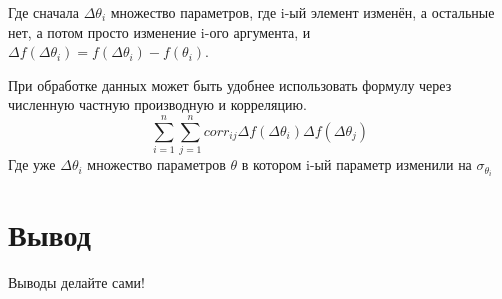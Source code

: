 \documentclass[a4paper,12pt]{article}
\begin{document}
 Где  сначала $\Delta \theta_i$ множество параметров, где i-ый элемент изменён, а остальные нет, а потом просто изменение i-ого аргумента,
  и $\Delta f(\Delta \theta_i) = f(\Delta \theta_i) - f(\theta_i)$.

При обработке данных может быть удобнее использовать формулу через численную частную производную и корреляцию.
\[  \sum_{i=1}^{n}\sum_{j=1}^{n} corr_{ij}\Delta f(\Delta \theta_i)\Delta f(\Delta \theta_j) \]
Где уже $\Delta \theta_i$ множество параметров $\theta$ в котором i-ый параметр изменили на $\sigma_{\theta_i}$ 
\section{Вывод}
Выводы делайте сами!
\end{document}
